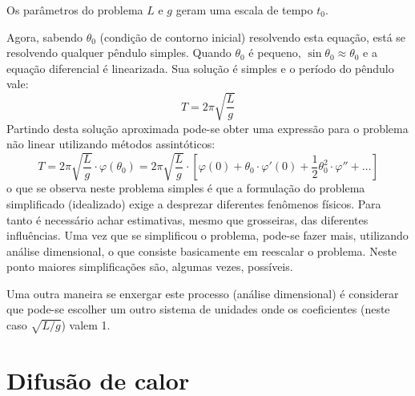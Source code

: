 Os parâmetros do problema $L$ e $g$ geram uma escala de tempo $t_0$.

Agora, sabendo $\theta_0$ (condição de contorno inicial) resolvendo esta equação, está se resolvendo qualquer pêndulo simples. Quando $\theta_0$ é pequeno, $\sin\theta_0\approx\theta_0$ e a equação diferencial é linearizada. Sua solução é simples e o período do pêndulo vale:
\[
T = 2\pi\sqrt{\frac{L}{g}}
\]
Partindo desta solução aproximada pode-se obter uma expressão para o problema não linear utilizando métodos assintóticos:
\[
T = 2\pi\sqrt{\frac{L}{g}}\cdot\varphi(\theta_0) = 2\pi \sqrt{\frac{L}{g}} \cdot\left[\varphi(0) + \theta_0\cdot\varphi'(0) +
\frac{1}{2}\theta_0^2\cdot\varphi'' + \ldots\right]
\]
o que se observa neste problema simples é que a formulação do problema simplificado (idealizado) exige a desprezar diferentes fenômenos físicos. Para tanto é necessário achar estimativas, mesmo que grosseiras, das diferentes influências. Uma vez que se simplificou o problema, pode-se fazer mais, utilizando análise dimensional, o que consiste basicamente em reescalar o problema. Neste ponto maiores simplificações são, algumas vezes, possíveis.

Uma outra maneira se enxergar este processo (análise dimensional) é considerar que pode-se escolher um outro sistema de unidades onde os coeficientes (neste caso $\sqrt{L/g}$) valem 1.

\section{Difusão de calor}
